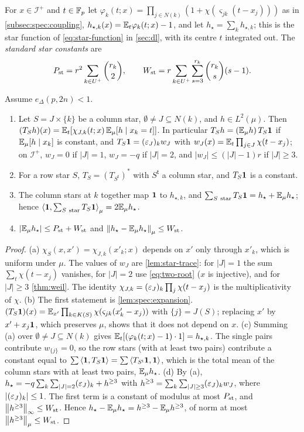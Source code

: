 For $x\in\mathcal I^+$ and $t\in\mathbb F_p$ let
$\varphi_k(t;x)=\prod_{j\in N(k)}(1+\chi(\varsigma_{jk}(t-x_j)))$ as in
\cref{subsec:spec:coupling}, $h_{\star,k}(x)=\mathbb E_t\varphi_k(t;x)-1$, and let
$h_\star=\sum_kh_{\star,k}$; this is the star function of
\eqref{eq:star-function} in \cref{sec:dl}, with its centre $t$
integrated out.
The \emph{standard star constants} are
\[
  P_{\rm st}=r^2\sum_{k\in U^+}\binom{r_k}2,\qquad
  W_{\rm st}=r\sum_{k\in U^+}\sum_{s=3}^{r_k}\binom{r_k}s(s-1).
\]

\begin{lemma}[Stars]\label{lem:spec:stars}
Assume $e_\Delta(p,2n)<1$.
\begin{enumerate}[label=\textup{(\alph*)}]
\item Let $S=J\times\{k\}$ be a column star, $\emptyset\ne J\subseteq N(k)$, and
  $h\in L^2(\mu)$. Then $(T_Sh)(x)=\mathbb E_t[\chi_{J,k}(t;x)\,\mathbb E_\mu[h\mid x_k=t]]$. In
  particular $T_Sh=(\mathbb E_\mu h)\,T_S\mathbf 1$ if $\mathbb E_\mu[h\mid x_k]$ is constant, and
  $T_S\mathbf 1=(\varepsilon_J)_kw_J$ with $w_J(x)=\mathbb E_t\prod_{j\in J}\chi(t-x_j)$; on $\mathcal I^+$,
  $w_J=0$ if $|J|=1$, $w_J=-q$ if $|J|=2$, and $|w_J|\le(|J|-1)r$ if $|J|\ge3$.
\item For a row star $S$, $T_S=(T_{S^{\mathsf t}})^*$ with $S^{\mathsf t}$ a column star,
  and $T_S\mathbf 1$ is a constant.
\item The column stars at $k$ together map $\mathbf 1$ to $h_{\star,k}$, and
  $\sum_{S\ \rm star}T_S\mathbf 1=h_\star+\mathbb E_\mu h_\star$; hence
  $\left\langle \mathbf 1,\sum_{S\ \rm star}T_S\mathbf 1\right\rangle_\mu=2\mathbb E_\mu h_\star$.
\item $|\mathbb E_\mu h_\star|\le P_{\rm st}+W_{\rm st}$ and $\left\|h_\star-\mathbb E_\mu h_\star\right\|_\mu\le W_{\rm st}$.
\end{enumerate}
\end{lemma}

\begin{proof}
(a) $\chi_S(x,x')=\chi_{J,k}(x'_k;x)$ depends on $x'$ only through $x'_k$, which is
uniform under $\mu$. The values of $w_J$ are \cref{lem:star-trace}: for $|J|=1$
the sum $\sum_t\chi(t-x_j)$ vanishes, for $|J|=2$ use \eqref{eq:two-root}
($x$ is injective), and for $|J|\ge3$ \cref{thm:weil}. The identity
$\chi_{J,k}=(\varepsilon_J)_k\prod_j\chi(t-x_j)$ is the multiplicativity of $\chi$.
(b) The first statement is \cref{lem:spec:expansion}. $(T_S\mathbf 1)(x)=\mathbb E_{x'}\prod_{k\in
K(S)}\chi(\varsigma_{jk}(x'_k-x_j))$ with $\{j\}=J(S)$; replacing $x'$ by $x'+x_j\mathbf 1$,
which preserves $\mu$, shows that it does not depend on $x$.
(c) Summing (a) over $\emptyset\ne J\subseteq N(k)$ gives
$\mathbb E_t[(\varphi_k(t;x)-1)\cdot1]=h_{\star,k}$. The single pairs contribute $w_{\{j\}}=0$,
so the row stars (with at least two pairs) contribute a constant equal to
$\sum\left\langle \mathbf 1,T_S\mathbf 1\right\rangle=\sum\left\langle T_{S^{\mathsf t}}\mathbf 1,\mathbf 1\right\rangle$, which is the total mean of the
column stars with at least two pairs, $\mathbb E_\mu h_\star$.
(d) By (a), $h_\star=-q\sum_k\sum_{|J|=2}(\varepsilon_J)_k+h^{\ge3}$ with
$h^{\ge3}=\sum_k\sum_{|J|\ge3}(\varepsilon_J)_kw_J$, where $|(\varepsilon_J)_k|\le1$. The first term is a
constant of modulus at most $P_{\rm st}$, and $\left\|h^{\ge3}\right\|_\infty\le W_{\rm st}$.
Hence $h_\star-\mathbb E_\mu h_\star=h^{\ge3}-\mathbb E_\mu h^{\ge3}$, of norm at most
$\left\|h^{\ge3}\right\|_\mu\le W_{\rm st}$.
\end{proof}

